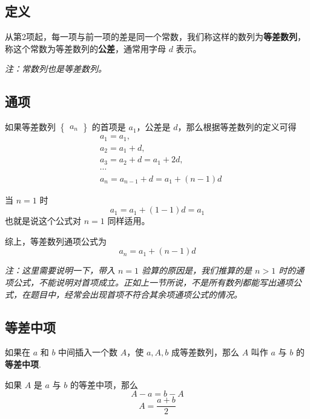 
\subsection{定义}
从第2项起，每一项与前一项的差是同一个常数，我们称这样的数列为\textbf{等差数列}，称这个常数为等差数列的\textbf{公差}，通常用字母 $d$ 表示。

\textsl{注：常数列也是等差数列。}

\subsection{通项}
如果等差数列 $\begin{Bmatrix} a_n \end{Bmatrix}$ 的首项是 $a_1$，公差是 $d$，那么根据等差数列的定义可得
\begin{equation}
\begin{aligned}
&a_1 = a_1,\\
&a_2 = a_1 + d,\\
&a_3 = a_2 + d = a_1 + 2d,\\
&\cdots \\
&a_n = a_{n-1} + d = a_1 + (n - 1)d
\end{aligned}
\end{equation}

当 $n = 1$ 时
\begin{equation}
a_1 = a_1 + (1 - 1)d = a_1
\end{equation}
也就是说这个公式对 $n = 1$ 同样适用。

综上，等差数列通项公式为
\begin{equation}
a_n = a_1 + (n - 1)d
\end{equation}

\textsl{注：这里需要说明一下，带入 $n = 1$ 验算的原因是，我们推算的是 $n > 1$ 时的通项公式，不能说明对首项成立。正如上一节所说，不是所有数列都能写出通项公式，在题目中，经常会出现首项不符合其余项通项公式的情况。}

\subsection{等差中项}
如果在 $a$ 和 $b$ 中间插入一个数 $A$，使 $a,A,b$ 成等差数列，那么 $A$ 叫作 $a$ 与 $b$ 的\textbf{等差中项}.

如果 $A$ 是 $a$ 与 $b$ 的等差中项，那么
\begin{equation}
A - a = b - A
\end{equation}
\begin{equation}
A = \frac{a+b}{2}
\end{equation}

